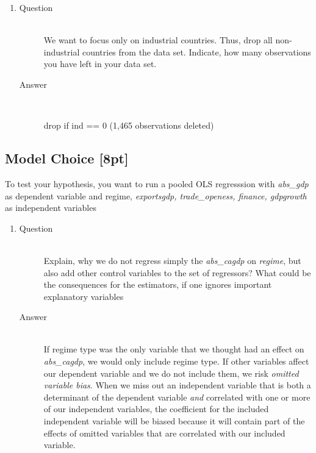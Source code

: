\documentclass{article}
\begin{document}
\begin{enumerate}[label=(\alph*)]
\begin{enumerate}[label=(\roman*)]
    \end{enumerate}
    \item 
    \begin{description}
      \item[Question] \hfill \\
      We want to focus only on industrial countries. Thus, drop all non-industrial countries from the data set. Indicate, how many observations you have left in your data set.
      \item[Answer] \hfill \\
      \begin{CVerbatim}
  drop if ind == 0
  (1,465 observations deleted)
      \end{CVerbatim}
    \end{description}
  \end{enumerate}
  
\subsection{Model Choice [8pt]}
To test your hypothesis, you want to run a pooled OLS regresssion with \textit{abs\_gdp} as dependent variable and regime, \textit{exportsgdp, trade\_openess, finance, gdpgrowth} as independent variables
  \begin{enumerate}[label=(\alph*)]
    \item 
    \begin{description}
      \item[Question] \hfill \\
      Explain, why we do not regress simply the \textit{abs\_cagdp} on \textit{regime}, but also add other control variables to the set of regressors? What could be the consequences for the estimators, if one ignores important explanatory variables
      \item[Answer] \hfill \\
      If regime type was the only variable that we thought had an effect on \textit{abs\_cagdp}, we would only include regime type. If other variables affect our dependent variable and we do not include them, we risk \textit{omitted variable bias}. When we miss out an independent variable that is both a determinant of the dependent variable \textit{and} correlated with one or more of our independent variables, the coefficient for the included independent variable will be biased because it will contain part of the effects of omitted variables that are correlated with our included variable.
    \end{description}
  \end{enumerate}
  
\end{document}

